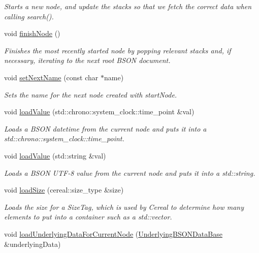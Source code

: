 \begin{DoxyCompactItemize}
\begin{DoxyCompactList}\small\item\em Starts a new node, and update the stacks so that we fetch the correct data when calling search(). \end{DoxyCompactList}\item 
void \hyperlink{classbson__mapper_1_1BSONInputArchive_a9360961eba7c7c430329eed30667a2de}{finish\+Node} ()\hypertarget{classbson__mapper_1_1BSONInputArchive_a9360961eba7c7c430329eed30667a2de}{}\label{classbson__mapper_1_1BSONInputArchive_a9360961eba7c7c430329eed30667a2de}

\begin{DoxyCompactList}\small\item\em Finishes the most recently started node by popping relevant stacks and, if necessary, iterating to the next root B\+S\+ON document. \end{DoxyCompactList}\item 
void \hyperlink{classbson__mapper_1_1BSONInputArchive_a5536f703a1f8d0f19fca666290ee6b42}{set\+Next\+Name} (const char $\ast$name)
\begin{DoxyCompactList}\small\item\em Sets the name for the next node created with start\+Node. \end{DoxyCompactList}\item 
void \hyperlink{classbson__mapper_1_1BSONInputArchive_a457680690d03b26a9600b9139d1b9bd9}{load\+Value} (std\+::chrono\+::system\+\_\+clock\+::time\+\_\+point \&val)
\begin{DoxyCompactList}\small\item\em Loads a B\+S\+ON datetime from the current node and puts it into a std\+::chrono\+::system\+\_\+clock\+::time\+\_\+point. \end{DoxyCompactList}\item 
void \hyperlink{classbson__mapper_1_1BSONInputArchive_afa63fee8fca6808c51178fb6a7767abd}{load\+Value} (std\+::string \&val)
\begin{DoxyCompactList}\small\item\em Loads a B\+S\+ON U\+T\+F-\/8 value from the current node and puts it into a std\+::string. \end{DoxyCompactList}\item 
void \hyperlink{classbson__mapper_1_1BSONInputArchive_a28c16081fe45749c56f5d65b1ab01d40}{load\+Size} (cereal\+::size\+\_\+type \&size)
\begin{DoxyCompactList}\small\item\em Loads the size for a Size\+Tag, which is used by Cereal to determine how many elements to put into a container such as a std\+::vector. \end{DoxyCompactList}\item 
void \hyperlink{classbson__mapper_1_1BSONInputArchive_ad3fae22817ce463e8a3055a1f04e7a91}{load\+Underlying\+Data\+For\+Current\+Node} (\hyperlink{classbson__mapper_1_1UnderlyingBSONDataBase}{Underlying\+B\+S\+O\+N\+Data\+Base} \&underlying\+Data)\hypertarget{classbson__mapper_1_1BSONInputArchive_ad3fae22817ce463e8a3055a1f04e7a91}{}\label{classbson__mapper_1_1BSONInputArchive_ad3fae22817ce463e8a3055a1f04e7a91}


\end{DoxyCompactItemize}
